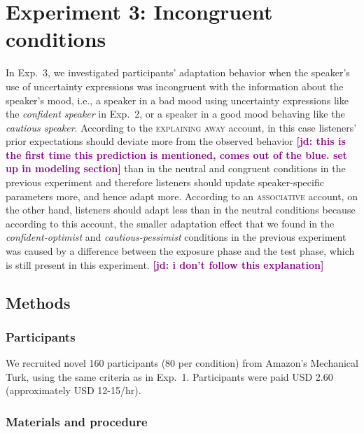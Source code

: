 \documentclass[man,floatsintext]{apa6}
\newcommand{\jd}[1]{\textcolor{Purple}{\bf [jd: #1]}}
\begin{document}
\section{Experiment 3: Incongruent conditions}

In Exp.~3, we investigated participants' adaptation behavior when the speaker's use of uncertainty expressions was incongruent with the information about the speaker's mood, i.e., a speaker in a bad mood using uncertainty expressions like the \textit{confident speaker} in Exp.~2, or a speaker in a good mood behaving like the \textit{cautious speaker}. According to the \textsc{explaining away} account, in this case listeners' prior expectations should deviate more from the observed behavior \jd{this is the first time this prediction is mentioned, comes out of the blue. set up in modeling section} than in the neutral and congruent conditions in the previous experiment and therefore listeners should update speaker-specific parameters more, and hence adapt more.  According to an \textsc{associative} account, on the other hand, listeners should adapt less than in the neutral conditions because according to this account, the smaller adaptation effect that we found in the \textit{confident-optimist} and \textit{cautious-pessimist} conditions in the previous experiment was caused by a difference between the exposure phase and the test phase, which is still present in this experiment. \jd{i don't follow this explanation}


\subsection{Methods}

\subsubsection{Participants} We recruited novel 160 participants (80 per condition) from Amazon's Mechanical Turk, using the same criteria as in Exp.~1. Participants were paid USD 2.60 (approximately USD 12-15/hr).


\subsubsection{Materials and procedure}
\end{document}
